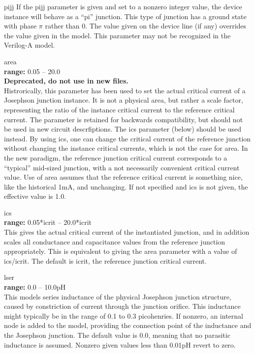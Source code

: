 \begin{description}
\item{\vt pijj}
If the {\vt pijj} parameter is given and set to a nonzero integer
value, the device instance will behave as a ``pi'' junction.  This
type of junction has a ground state with phase $\pi$ rather than 0. 
The value given on the device line (if any) overrides the value given
in the model.  This parameter may not be recognized in the Verilog-A
model.

\item{\vt area}\\
{\bf range:} 0.05 -- 20.0\\
{\bf Deprecated, do not use in new files.}\\
Histrorically, this parameter has been used to set the actual critical
current of a Josephson junction instance.  It is not a physical area,
but rather a scale factor, representing the ratio of the instance
critical current to the reference critical current.  The parameter is
retained for backwards compatibility, but should not be used in new
circuit descrfiptions.  The {\vt ics} parameter (below) should be used
instead.  By using {\vt ics}, one can change the critical current of
the reference junction without changing the instance critical
currents, which is not the case for {\vt area}.  In the new paradigm,
the reference junction critical current corresponds to a ``typical''
mid-sized junction, with a not necessarily convenient critical current
value.  Use of {\vt area} assumes that the reference critical current
is something nice, like the historical 1mA, and unchanging.  If not
specified and {\vt ics} is not given, the effective value is 1.0.

\item{\vt ics}\\
{\bf range:} 0.05*{\vt icrit} -- 20.0*{\vt icrit}\\
This gives the actual critical current of the instantiated junction,
and in addition scales all conductance and capacitance values from the
reference junction appropriately.  This is equivalent to giving the
{\vt area} parameter with a value of {\vt ics}/{\vt icrit}.  The
default is {\vt icrit}, the reference junction critical current.

\item{\vt lser}\\
{\bf range:} 0.0 -- 10.0pH\\
This models series inductance of the physical Josephson junction
structure, caused by constriction of current through the junction
orifice.  This inductance might typically be in the range of 0.1 to
0.3 picohenries.  If nonzero, an internal node is added to the model,
providing the connection point of the inductance and the Josephson
junction.  The default value is 0.0, meaning that no parasitic
inductance is assumed.  Nonzero given values less than 0.01pH revert
to zero.


\end{description}
